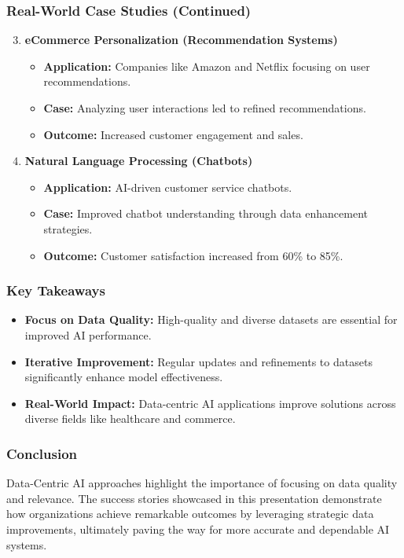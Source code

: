 \documentclass[aspectratio=169]{beamer}
\begin{document}
\begin{frame}[fragile]
    \frametitle{Real-World Case Studies (Continued)}
    \begin{enumerate}
        \setcounter{enumi}{2}
        \item \textbf{eCommerce Personalization (Recommendation Systems)}
            \begin{itemize}
                \item \textbf{Application:} Companies like Amazon and Netflix focusing on user recommendations.
                \item \textbf{Case:} Analyzing user interactions led to refined recommendations.
                \item \textbf{Outcome:} Increased customer engagement and sales.
            \end{itemize}
        \item \textbf{Natural Language Processing (Chatbots)}
            \begin{itemize}
                \item \textbf{Application:} AI-driven customer service chatbots.
                \item \textbf{Case:} Improved chatbot understanding through data enhancement strategies.
                \item \textbf{Outcome:} Customer satisfaction increased from 60\% to 85\%.
            \end{itemize}
    \end{enumerate}
\end{frame}

\begin{frame}[fragile]
    \frametitle{Key Takeaways}
    \begin{itemize}
        \item \textbf{Focus on Data Quality:} High-quality and diverse datasets are essential for improved AI performance.
        \item \textbf{Iterative Improvement:} Regular updates and refinements to datasets significantly enhance model effectiveness.
        \item \textbf{Real-World Impact:} Data-centric AI applications improve solutions across diverse fields like healthcare and commerce.
    \end{itemize}
\end{frame}

\begin{frame}[fragile]
    \frametitle{Conclusion}
    Data-Centric AI approaches highlight the importance of focusing on data quality and relevance. The success stories showcased in this presentation demonstrate how organizations achieve remarkable outcomes by leveraging strategic data improvements, ultimately paving the way for more accurate and dependable AI systems.
\end{frame}
\end{document}
